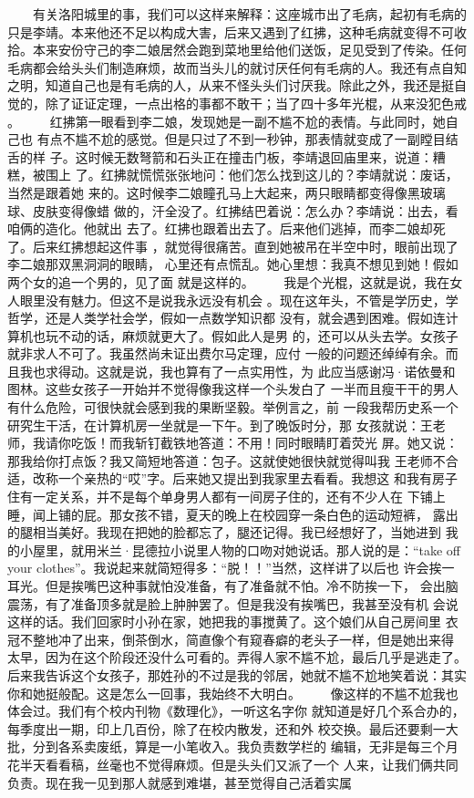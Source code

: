  　　有关洛阳城里的事，我们可以这样来解释：这座城市出了毛病，起初有毛病的 只是李靖。本来他还不足以构成大害，后来又遇到了红拂，这种毛病就变得不可收 拾。本来安份守己的李二娘居然会跑到菜地里给他们送饭，足见受到了传染。任何 毛病都会给头头们制造麻烦，故而当头儿的就讨厌任何有毛病的人。我还有点自知 之明，知道自己也是有毛病的人，从来不怪头头们讨厌我。除此之外，我还是挺自 觉的，除了证证定理，一点出格的事都不敢干；当了四十多年光棍，从来没犯色戒 。 　　红拂第一眼看到李二娘，发现她是一副不尴不尬的表情。与此同时，她自己也 有点不尴不尬的感觉。但是只过了不到一秒钟，那表情就变成了一副瞠目结舌的样 子。这时候无数弩箭和石头正在撞击门板，李靖退回庙里来，说道：糟糕，被围上 了。红拂就慌慌张张地问：他们怎么找到这儿的？李靖就说：废话，当然是跟着她 来的。这时候李二娘瞳孔马上大起来，两只眼睛都变得像黑玻璃球、皮肤变得像蜡 做的，汗全没了。红拂结巴着说：怎么办？李靖说：出去，看咱俩的造化。他就出 去了。红拂也跟着出去了。后来他们逃掉，而李二娘却死了。后来红拂想起这件事 ，就觉得很痛苦。直到她被吊在半空中时，眼前出现了李二娘那双黑洞洞的眼睛， 心里还有点慌乱。她心里想：我真不想见到她！假如两个女的追一个男的，见了面 就是这样的。 　　我是个光棍，这就是说，我在女人眼里没有魅力。但这不是说我永远没有机会 。现在这年头，不管是学历史，学哲学，还是人类学社会学，假如一点数学知识都 没有，就会遇到困难。假如连计算机也玩不动的话，麻烦就更大了。假如此人是男 的，还可以从头去学。女孩子就非求人不可了。我虽然尚未证出费尔马定理，应付 一般的问题还绰绰有余。而且我也求得动。这就是说，我也算有了一点实用性，为 此应当感谢冯·诺依曼和图林。这些女孩子一开始并不觉得像我这样一个头发白了 一半而且瘦干干的男人有什么危险，可很快就会感到我的果断坚毅。举例言之，前 一段我帮历史系一个研究生干活，在计算机房一坐就是一下午。到了晚饭时分，那 女孩就说：王老师，我请你吃饭！而我斩钉截铁地答道：不用！同时眼睛盯着荧光 屏。她又说：那我给你打点饭？我又简短地答道：包子。这就使她很快就觉得叫我 王老师不合适，改称一个亲热的“哎”字。后来她又提出到我家里去看看。我想这 和我有房子住有一定关系，并不是每个单身男人都有一间房子住的，还有不少人在 下铺上睡，闻上铺的屁。那女孩不错，夏天的晚上在校园穿一条白色的运动短裤， 露出的腿相当美好。我现在把她的脸都忘了，腿还记得。我已经想好了，当她进到 我的小屋里，就用米兰·昆德拉小说里人物的口吻对她说话。那人说的是：“take off your clothes”。我说起来就简短得多：“脱！！”当然，这样讲了以后也 许会挨一耳光。但是挨嘴巴这种事就怕没准备，有了准备就不怕。冷不防挨一下， 会出脑震荡，有了准备顶多就是脸上肿肿罢了。但是我没有挨嘴巴，我甚至没有机 会说这样的话。我们回家时小孙在家，她把我的事搅黄了。这个娘们从自己房间里 衣冠不整地冲了出来，倒茶倒水，简直像个有窥春癖的老头子一样，但是她出来得 太早，因为在这个阶段还没什么可看的。弄得人家不尴不尬，最后几乎是逃走了。 后来我告诉这个女孩子，那姓孙的不过是我的邻居，她就不尴不尬地笑着说：其实 你和她挺般配。这是怎么一回事，我始终不大明白。 　　像这样的不尴不尬我也体会过。我们有个校内刊物《数理化》，一听这名字你 就知道是好几个系合办的，每季度出一期，印上几百份，除了在校内散发，还和外 校交换。最后还要剩一大批，分到各系卖废纸，算是一小笔收入。我负责数学栏的 编辑，无非是每三个月花半天看看稿，丝毫也不觉得麻烦。但是头头们又派了一个 人来，让我们俩共同负责。现在我一见到那人就感到难堪，甚至觉得自己活着实属 